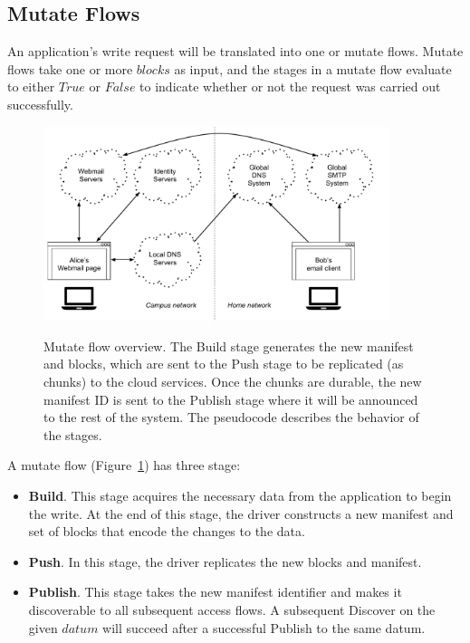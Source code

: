 \subsection{Mutate Flows}

An application's write request will be translated into one or mutate flows.
Mutate flows take one or more $blocks$ as input, and the stages in a mutate flow
evaluate to either $True$ or $False$ to indicate whether or not the request was
carried out successfully.

\begin{figure}[h]
   \caption{Mutate flow overview.  The Build stage generates the new manifest
   and blocks, which are sent to the Push stage to be replicated (as chunks) to
   the cloud services.  Once the chunks are durable, the new manifest ID is
   sent to the Publish stage where it will be announced to the rest of the
   system.  The pseudocode describes the behavior of the stages.}
   \centering
   \includegraphics[width=0.9\textwidth,page=8]{figures/dissertation-figures}
   \label{fig:chap2-mutate-flow}
\end{figure}

A mutate flow (Figure~\ref{fig:chap2-mutate-flow}) has three stage:

\begin{itemize}
    \item \textbf{Build}.  This stage acquires the necessary data from the
application to begin the write.  At the end of this stage, the driver constructs
a new manifest and set of blocks that encode the changes to the data. 
    \item \textbf{Push}.  In this stage, the driver replicates the new blocks and
manifest.
    \item \textbf{Publish}.  This stage takes the new manifest identifier and makes
it discoverable to all subsequent access flows.  A subsequent Discover on the
given $datum$ will succeed after a successful Publish to the same datum.
\end{itemize}


